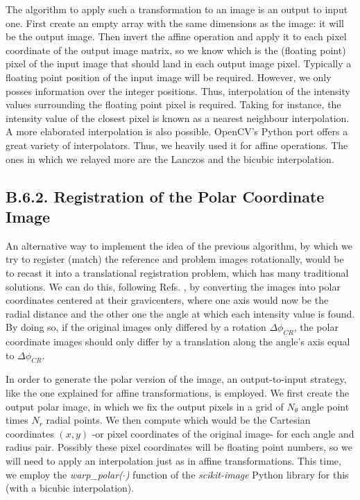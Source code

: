 \documentclass[11pt, a4paper, twoside]{article} %
\begin{document}
{The algorithm to apply such a transformation to an image is an output to input one. First create an empty array with the same dimensions as the image: it will be the output image. Then invert the affine operation and apply it to each pixel coordinate of the output image matrix, so we know which is the (floating point) pixel of the input image that should land in each output image pixel. Typically a floating point position of the input image will be required. However, we only posses information over the integer positions. Thus, interpolation of the intensity values surrounding the floating point pixel is required. Taking for instance, the intensity value of the closest pixel is known as a nearest neighbour interpolation. A more elaborated interpolation is also possible. OpenCV's Python port \cite{cv2} offers a great variety of interpolators. Thus, we heavily used it for affine operations. The ones in which we relayed more are the Lanczos \cite{Lanczos} and the bicubic interpolation.

}\vspace{-0.35cm}

\subsection*{B.6.2. Registration of the Polar Coordinate Image \vspace{-0.15cm}}
An alternative way to implement the idea of the previous algorithm, by which we try to register (match) the reference and problem images rotationally, would be to recast it into a translational registration problem, which has many traditional solutions. We can do this, following Refs. \cite{phase,phase2}, by converting the images into polar coordinates centered at their gravicenters, where one axis would now be the radial distance and the other one the angle at which each intensity value is found. By doing so, if the original images only differed by a rotation $\Delta\phi_{CR}$, the polar coordinate images should only differ by a translation along the angle's axis equal to $\Delta\phi_{CR}$.

In order to generate the polar version of the image, an output-to-input strategy, like the one explained for affine transformations, is employed. We first create the output polar image, in which we fix the output pixels in a grid of $N_\theta$ angle point times $N_r$ radial points. We then compute which would be the Cartesian coordinates $(x,y)$ -or pixel coordinates of the original image- for each angle and radius pair. Possibly these pixel coordinates will be floating point numbers, so we will need to apply an interpolation just as in affine transformations. This time, we employ the {\em warp\_polar($\cdot$)} function of the {\em scikit-image} Python library \cite{skimage} for this (with a bicubic interpolation).
\end{document}
